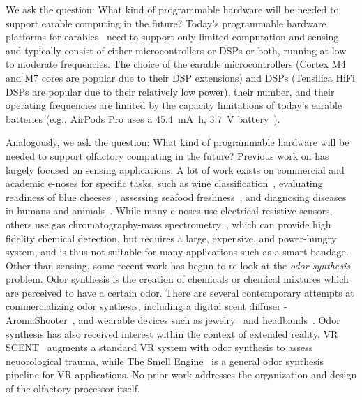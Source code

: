 
We ask the question: What kind of programmable hardware will be needed to
support earable computing in the future?  Today's programmable hardware
platforms for earables~\cite{MT25, nxplpc, is2062, quicklogic, nuvoton} need to
support only limited computation and sensing and typically consist of either
microcontrollers or DSPs or both, running at low to moderate frequencies. The
choice of the earable microcontrollers (Cortex M4 and M7 cores are popular due
to their DSP extensions) and DSPs (Tensilica HiFi DSPs are popular due to their
relatively low power), their number, and their operating frequencies are
limited by the capacity limitations of today's earable batteries (e.g., AirPods
Pro uses a \SI{45.4}{\milli\ampere\hour}, \SI{3.7}{\volt}
battery~\cite{airpodsprobattery}).

Analogously, we ask the question: What kind of programmable hardware will be needed to
support olfactory computing in the future?
Previous work on \olfc{} has largely focused on sensing applications. A lot of
work exists on commercial and academic e-noses for specific tasks, such as wine
classification~\cite{buratti2004characterization}, evaluating readiness of blue
cheeses~\cite{valente2018cheeses}, assessing seafood freshness~\cite{grassi2022seafood}, and
diagnosing diseases in humans and animals~\cite{gardner2000electronic,
binson2021discrimination, va2021noninvasive, d2010investigation}.  While many
e-noses use electrical resistive sensors, others use gas chromatography-mass
spectrometry~\cite{electronic_sensor_technology, alpha_2018, pan2014early},
which can provide high fidelity chemical detection, but requires a large,
expensive, and power-hungry system, and is thus not suitable for many \olfc{}
applications such as a smart-bandage.
Other than sensing, some recent work has begun to re-look at the \textit{odor
synthesis} problem.%
Odor synthesis is the creation of
chemicals or chemical mixtures which are perceived to have a certain odor.
There are several contemporary attempts at commercializing odor synthesis,
including a digital scent diffuser - AromaShooter~\cite{aromajoin_corporation},
and wearable devices such as jewelry~\cite{tillotson2006scent} and
headbands~\cite{amores2018promoting}. Odor synthesis has also received interest
within the context of extended reality.  VR SCENT~\cite{olorama_technology}
augments a standard VR system with odor synthesis to assess neuorological
trauma, while The Smell Engine~\cite{bahremand2022smell} is a general odor
synthesis pipeline for VR applications.
No prior work addresses
the organization and design of the olfactory processor itself.


